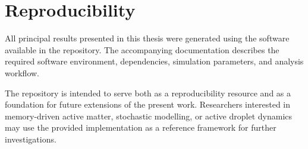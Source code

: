 \section{Reproducibility}

All principal results presented in this thesis were generated using the software available in the repository. The accompanying documentation describes the required software environment, dependencies, simulation parameters, and analysis workflow.

The repository is intended to serve both as a reproducibility resource and as a foundation for future extensions of the present work. Researchers interested in memory-driven active matter, stochastic modelling, or active droplet dynamics may use the provided implementation as a reference framework for further investigations.
